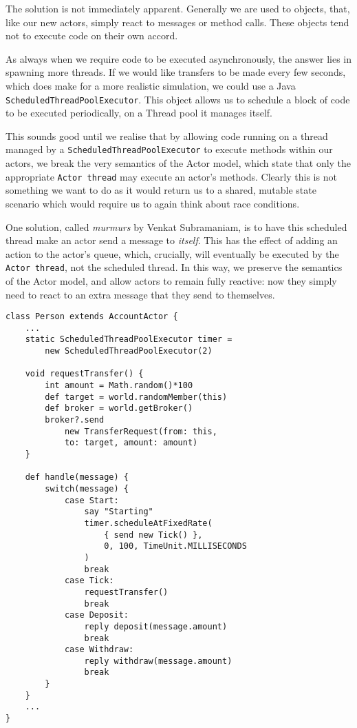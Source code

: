 \documentclass[a4paper,12pt]{kth-mag}
\begin{document}
The solution is not immediately apparent. Generally we are used to objects, that, like our new actors, simply react to messages or method calls. These objects tend not to execute code on their own accord. 

As always when we require code to be executed asynchronously, the answer lies in spawning more threads. If we would like transfers to be made every few seconds, which does make for a more realistic simulation, we could use a Java \texttt{ScheduledThreadPoolExecutor}. This object allows us to schedule a block of code to be executed periodically, on a Thread pool it manages itself.

This sounds good until we realise that by allowing code running on a thread managed by a \texttt{ScheduledThreadPoolExecutor} to execute methods within our actors, we break the very semantics of the Actor model, which state that only the appropriate \texttt{Actor thread} may execute an actor's methods. Clearly this is not something we want to do as it would return us to a shared, mutable state scenario which would require us to again think about race conditions.

One solution, called \textit{murmurs} by Venkat Subramaniam, is to have this scheduled thread make an actor send a message to \textit{itself}. This has the effect of adding an action to the actor's queue, which, crucially, will eventually be executed by the \texttt{Actor thread}, not the scheduled thread. In this way, we preserve the semantics of the Actor model, and allow actors to remain fully reactive: now they simply need to react to an extra message that they send to themselves.

\begin{listing}[H]
	\begin{verbatim}
class Person extends AccountActor {
    ...
    static ScheduledThreadPoolExecutor timer = 
        new ScheduledThreadPoolExecutor(2)

    void requestTransfer() {
        int amount = Math.random()*100
        def target = world.randomMember(this)
        def broker = world.getBroker()
        broker?.send 
            new TransferRequest(from: this, 
            to: target, amount: amount)
    }

    def handle(message) { 
        switch(message) {
            case Start:
                say "Starting"
                timer.scheduleAtFixedRate(
                    { send new Tick() },
                    0, 100, TimeUnit.MILLISECONDS
                )
                break
            case Tick:
                requestTransfer()
                break
            case Deposit:
                reply deposit(message.amount)
                break
            case Withdraw: 
                reply withdraw(message.amount)
                break
        }
    }
    ...
}
	\end{verbatim}
\end{listing}
\end{document}
